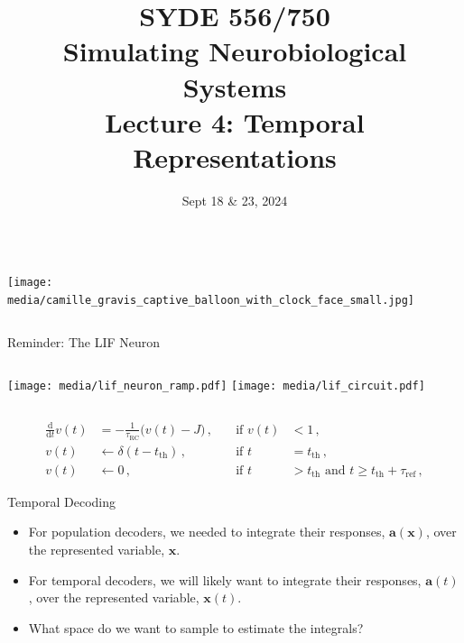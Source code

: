 \documentclass[handout,aspectratio=169]{beamer}
\date{Sept 18 \& 23, 2024}
\title{SYDE 556/750 \\ Simulating Neurobiological Systems \\ Lecture 4: Temporal Representations}
\begin{document}
\begin{frame}{}
	\vspace{0.5cm}
	\begin{columns}[c]
		\MakeTitle
		\texttt{[image: media/camille\_gravis\_captive\_balloon\_with\_clock\_face\_small.jpg]}
	\end{columns}
\end{frame}

\begin{frame}{Reminder: The LIF Neuron}
	\begin{columns}[c]
		\texttt{[image: media/lif\_neuron\_ramp.pdf]}
		\texttt{[image: media/lif\_circuit.pdf]}
	\end{columns}
	\begin{align*}
		\frac{\mathrm{d}}{\mathrm{d}t} v(t) &= -\frac{1}{\tau_\mathrm{RC}} \big( v(t) - J \big) \,, \quad &\text{if } v(t) &< 1\,, \\
		v(t) &\gets \delta(t - t_\mathrm{th}) \,, &\text{if } t &= t_\mathrm{th} \,,\\
		v(t) &\gets 0 \,, &\text{if } t &> t_\mathrm{th} \text{ and } t \geq t_\mathrm{th} + \tau_\mathrm{ref} \,,
	\end{align*}
\end{frame}

\begin{frame}{Temporal Decoding}
	\begin{itemize}
		\setlength{\itemsep}{0.25cm}
		\item For population decoders, we needed to integrate their responses, $\mathbf{a}(\mathbf{x})$,  over the represented variable, $\mathbf{x}$.
		\item <2->For temporal decoders, we will likely want to integrate their responses, $\mathbf{a}(t)$,  over the represented variable, $\mathbf{x}(t)$.
		\item <3->What space do we want to sample to estimate the integrals?
    \end{itemize}
\end{frame}
\end{document}
